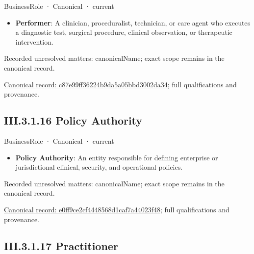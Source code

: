 \label{element:c87e99ff36224b9da5a05bbd3002da34}
{\small BusinessRole · Canonical · current}\par

\begin{itemize}


\item \textbf{Performer}: A clinician, proceduralist, technician, or care agent who executes a diagnostic test, surgical procedure, clinical observation, or therapeutic intervention.

\end{itemize}

{\small Recorded unresolved matters: canonicalName; exact scope remains in the canonical record.}\par
{\footnotesize \href{../../../../../../../continuum/business/business-role/c87e99ff36224b9da5a05bbd3002da34.md}{Canonical record: c87e99ff36224b9da5a05bbd3002da34}; full qualifications and provenance.}\par
\subsection*{III.3.1.16 Policy Authority}
\label{navigation:III.3.1.16}

\label{element:e0ff9ce2cf4448568d1caf7a44023f48}
{\small BusinessRole · Canonical · current}\par

\begin{itemize}


\item \textbf{Policy Authority}: An entity responsible for defining enterprise or jurisdictional clinical, security, and operational policies.

\end{itemize}

{\small Recorded unresolved matters: canonicalName; exact scope remains in the canonical record.}\par
{\footnotesize \href{../../../../../../../continuum/business/business-role/e0ff9ce2cf4448568d1caf7a44023f48.md}{Canonical record: e0ff9ce2cf4448568d1caf7a44023f48}; full qualifications and provenance.}\par
\subsection*{III.3.1.17 Practitioner}
\label{navigation:III.3.1.17}

